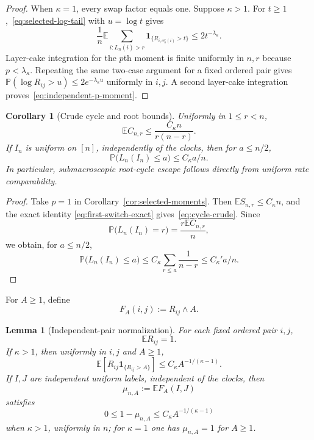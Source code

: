\documentclass[11pt]{article}
\newcommand{\E}{\mathbb E}
\newcommand{\Pp}{\mathbb P}
\newcommand{\1}{\mathbf 1}
\newtheorem{lemma}[theorem]{Lemma}
\newtheorem{corollary}[theorem]{Corollary}
\theoremstyle{definition}
\theoremstyle{remark}
\begin{document}
\begin{proof}
When $\kappa=1$, every swap factor equals one.  Suppose $\kappa>1$.
For $t\geq1$,~\eqref{eq:selected-log-tail} with $u=\log t$ gives
\[
 \frac1n\E\sum_{i:L_n(i)>r}
 \1_{\{R_{i,\sigma_n^r(i)}>t\}}
 \leq 2t^{-\lambda_\kappa}.
\]
Layer-cake integration for the $p$th moment is finite uniformly in
$n,r$ because $p<\lambda_\kappa$.  Repeating the same two-case
argument for a fixed ordered pair gives
$\Pp(\log R_{ij}>u)\leq2e^{-\lambda_\kappa u}$ uniformly in $i,j$.
A second layer-cake integration proves~\eqref{eq:independent-p-moment}.
\end{proof}

\begin{corollary}[Crude cycle and root bounds]
\label{cor:root-crude}
Uniformly in $1\le r<n$,
\begin{equation}\label{eq:cycle-crude}
 \E C_{n,r}\leq \frac{C_\kappa n}{r(n-r)}.
\end{equation}
If $I_n$ is uniform on $[n]$, independently of the clocks, then for
$a\le n/2$,
\begin{equation}\label{eq:root-crude}
 \Pp\bigl(L_n(I_n)\le a\bigr)\leq C_\kappa a/n.
\end{equation}
In particular, submacroscopic root-cycle escape follows directly from
uniform rate comparability.
\end{corollary}

\begin{proof}
Take $p=1$ in Corollary~\ref{cor:selected-moments}.  Then
$\E S_{n,r}\le C_\kappa n$, and the exact identity
\eqref{eq:first-switch-exact} gives~\eqref{eq:cycle-crude}.  Since
\[
 \Pp\bigl(L_n(I_n)=r\bigr)=\frac{r\E C_{n,r}}n,
\]
we obtain, for $a\le n/2$,
\[
 \Pp\bigl(L_n(I_n)\le a\bigr)
 \le C_\kappa\sum_{r\le a}\frac1{n-r}
 \le C_\kappa' a/n.
\]
\end{proof}

For $A\geq1$, define
\begin{equation}\label{eq:F-A-def}
 F_A(i,j):=R_{ij}\wedge A.
\end{equation}

\begin{lemma}[Independent-pair normalization]
\label{lem:independent-pair}
For each fixed ordered pair $i,j$,
\begin{equation}\label{eq:ERij-one}
  \E R_{ij}=1.
\end{equation}
If $\kappa>1$, then uniformly in $i,j$ and $A\geq1$,
\begin{equation}\label{eq:independent-R-tail}
 \E\left[R_{ij}\1_{\{R_{ij}>A\}}\right]
 \leq C_\kappa A^{-1/(\kappa-1)}.
\end{equation}
If $I,J$ are independent uniform labels, independent of the clocks, then
\begin{equation}\label{eq:muA-def}
  \mu_{n,A}:=\E F_A(I,J)
\end{equation}
satisfies
\begin{equation}\label{eq:muA-one}
  0\leq 1-\mu_{n,A}
  \leq C_\kappa A^{-1/(\kappa-1)}
\end{equation}
when $\kappa>1$, uniformly in $n$; for $\kappa=1$ one has
$\mu_{n,A}=1$ for $A\geq1$.
\end{lemma}
\end{document}
